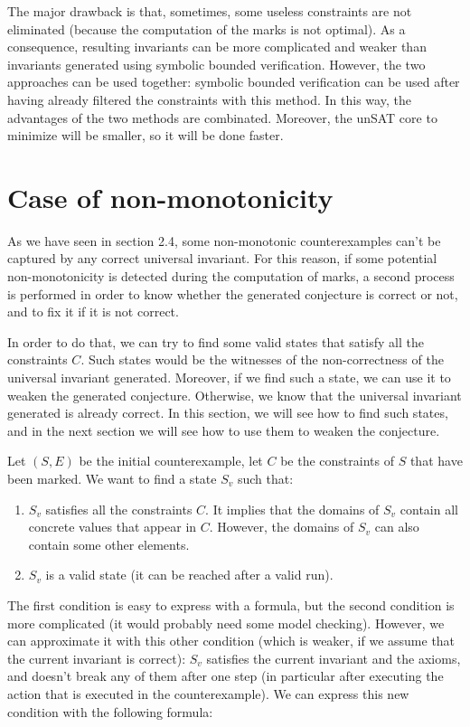 \documentclass[11pt,a4paper,oldfontcommands,openany]{memoir}
\begin{document}
    The major drawback is that, sometimes, some useless constraints are not eliminated (because the computation of the marks is not optimal).
    As a consequence, resulting invariants can be more complicated and weaker than invariants generated using symbolic bounded verification.
    However, the two approaches can be used together: symbolic bounded verification can be used after having already filtered the constraints with this method.
    In this way, the advantages of the two methods are combinated. Moreover, the unSAT core to minimize will be smaller, so it will be done faster.

    \section{Case of non-monotonicity}

    As we have seen in section 2.4, some non-monotonic counterexamples can't be captured by any correct universal invariant.
    For this reason, if some potential non-monotonicity is detected during the computation of marks,
    a second process is performed in order to know whether the generated conjecture is correct or not, and to fix it if it is not correct.
    
    In order to do that, we can try to find some valid states that satisfy all the constraints \(C\).
    Such states would be the witnesses of the non-correctness of the universal invariant generated.
    Moreover, if we find such a state, we can use it to weaken the generated conjecture.
    Otherwise, we know that the universal invariant generated is already correct.
    In this section, we will see how to find such states, and in the next section we will see how to use them to weaken the conjecture.

    Let \((S,E)\) be the initial counterexample, let \(C\) be the constraints of \(S\) that have been marked.
    We want to find a state \(S_v\) such that:
    \begin{enumerate}
        \item \(S_v\) satisfies all the constraints \(C\). It implies that the domains of \(S_v\) contain all concrete values that appear in \(C\).
        However, the domains of \(S_v\) can also contain some other elements.
        \item \(S_v\) is a valid state (it can be reached after a valid run).
    \end{enumerate}

    The first condition is easy to express with a formula, but the second condition is more complicated (it would probably need some model checking).
    However, we can approximate it with this other condition (which is weaker, if we assume that the current invariant is correct):
    \(S_v\) satisfies the current invariant and the axioms, and doesn't break any of them after one step (in particular after executing the action that is executed in the counterexample).
    We can express this new condition with the following formula:
\end{document}
